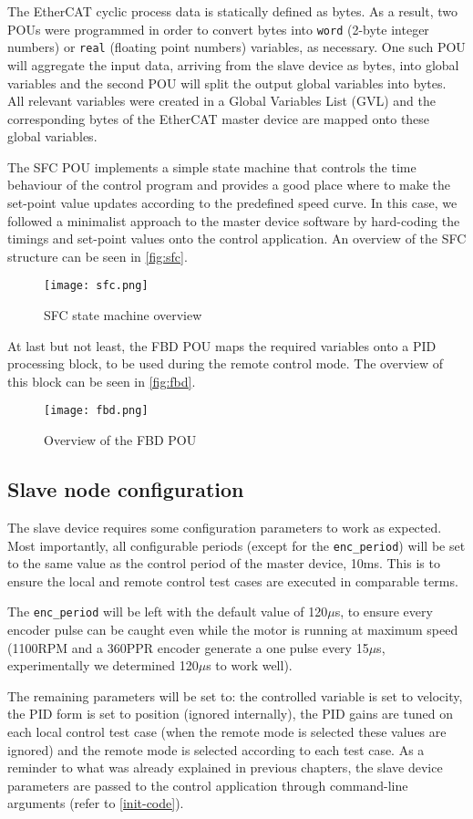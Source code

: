 The EtherCAT cyclic process data is statically defined as bytes.
As a result, two POUs were programmed in order to convert bytes into \verb|word| (2-byte integer numbers) or \verb|real| (floating point numbers) variables, as necessary.
One such POU will aggregate the input data, arriving from the slave device as bytes, into global variables and the second POU will split the output global variables into bytes.
All relevant variables were created in a Global Variables List (GVL) and the corresponding bytes of the EtherCAT master device are mapped onto these global variables.

The SFC POU implements a simple state machine that controls the time behaviour of the control program and provides a good place where to make the set-point value updates according to the predefined speed curve.
In this case, we followed a minimalist approach to the master device software by hard-coding the timings and set-point values onto the control application.
An overview of the SFC structure can be seen in \autoref{fig:sfc}.

\begin{figure}[htp]
	\centering
	\texttt{[image: sfc.png]}
	\caption{SFC state machine overview}
	\label{fig:sfc}
\end{figure}

At last but not least, the FBD POU maps the required variables onto a PID processing block, to be used during the remote control mode.
The overview of this block can be seen in \autoref{fig:fbd}.

\begin{figure}[htp]
	\centering
	\texttt{[image: fbd.png]}
	\caption{Overview of the FBD POU}
	\label{fig:fbd}
\end{figure}

\subsection{Slave node configuration}
The slave device requires some configuration parameters to work as expected.
Most importantly, all configurable periods (except for the \verb|enc_period|) will be set to the same value as the control period of the master device, 10ms.
This is to ensure the local and remote control test cases are executed in comparable terms.

The \verb|enc_period| will be left with the default value of 120$\mu$s, to ensure every encoder pulse can be caught even while the motor is running at maximum speed (1100RPM and a 360PPR encoder generate a one pulse every 15$\mu$s, experimentally we determined 120$\mu$s to work well).

The remaining parameters will be set to: the controlled variable is set to velocity, the PID form is set to position (ignored internally), the PID gains are tuned on each local control test case (when the remote mode is selected these values are ignored) and the remote mode is selected according to each test case.
As a reminder to what was already explained in previous chapters, the slave device parameters are passed to the control application through command-line arguments (refer to \autoref{init-code}).

